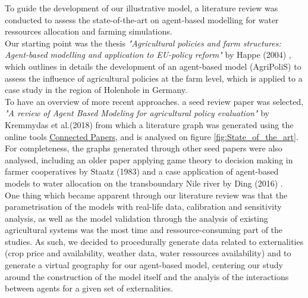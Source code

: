 \documentclass[a4paper,12pt]{article} %
\begin{document}
To guide the development of our illustrative model, a literature review was conducted to assess the state-of-the-art on agent-based modelling for water ressources allocation and farming simulations. \\
Our starting point was the thesis \textit{"Agricultural policies and farm structures: Agent-based modelling and application to EU-policy reform"} by Happe (2004) \cite{happeAgriculturalPoliciesFarm2004}, which outlines in details the development of an agent-based model (AgriPoliS) to assess the influence of agricultural policies at the farm level, which is applied to a case study in the region of Holenhole in Germany.\\
To have an overview of more recent approaches. a seed review paper was selected, \textit{"A review of Agent Based Modeling for agricultural policy evaluation"} by Kremmydas et al.(2018) \cite{kremmydasReviewAgentBased2018} from which a literature graph was generated using the online tools \href{https://www.connectedpapers.com/main/35fac7b643317e5f48f5280fadec94051bf2401f/A-review-of-Agent-Based-Modeling-for-agricultural-policy-evaluation/graph}{Connected Papers}, and is analysed on figure \ref{fig:State_of_the_art}.\\
For completeness, the graphs generated through other seed papers were also analysed, including an older paper applying game theory to decision making in farmer cooperatives by Staatz (1983) \cite{staatzGametheoreticAnalysisDecision1983} and a case application of agent-based models to water allocation on the transboundary Nile river by Ding (2016) \cite{dingAgentBasedModelling2016}.\\
One thing which became apparent through our literature review was that the parametrisation of the models with real-life data, calibration and sensitivity analysis, as well as the model validation through the analysis of existing agricultural systems was the most time and ressource-consuming part of the studies. As such, we decided to procedurally generate data related to externalities (crop price and availability, weather data, water ressources availability) and to generate a virtual geography for our agent-based model, centering our study around the construction of the model itself and the analyis of the interactions between agents for a given set of externalities.
\end{document}
